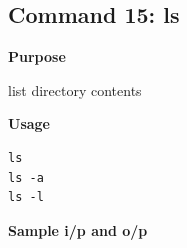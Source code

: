 \subsection{Command 15: ls} 
\textbf{Purpose}
\begin{flushleft}
 list directory contents
\end{flushleft}
\textbf{Usage}
\begin{verbatim}
ls
ls -a
ls -l
\end{verbatim}
\textbf{Sample i/p and o/p}
\begin{figure}[H] 
\end{figure}

